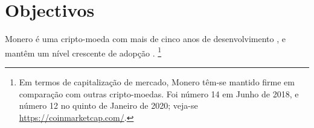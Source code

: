 


\section{Objectivos}
\label{sec:goals}
Monero é uma cripto-moeda com mais de cinco anos de desenvolvimento
\cite{bitmonero-launched, monero-history}, e mantêm um nível crescente de adopção
\cite{justin-defcon-2019-community-growth}.
\footnote{\label{marketcap_note} Em termos de capitalização de mercado, Monero têm-se mantido firme em comparação com outras cripto-moedas. Foi número 14 em Junho de 2018, e número 12 no quinto de Janeiro de 2020; veja-se \url{https://coinmarketcap.com/}.}


